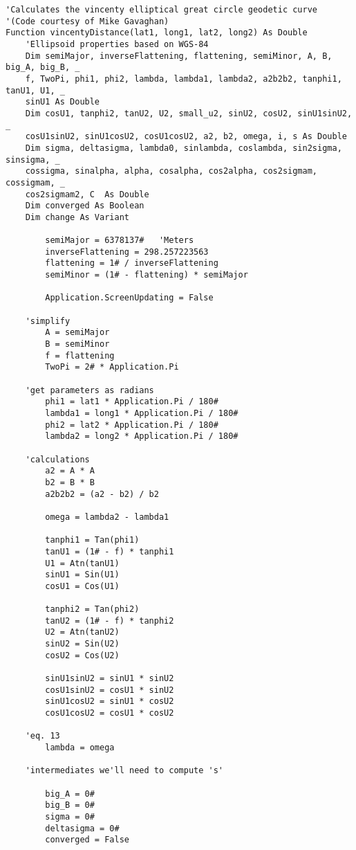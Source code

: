 \begin{lstlisting}
'Calculates the vincenty elliptical great circle geodetic curve 
'(Code courtesy of Mike Gavaghan)
Function vincentyDistance(lat1, long1, lat2, long2) As Double
    'Ellipsoid properties based on WGS-84
    Dim semiMajor, inverseFlattening, flattening, semiMinor, A, B, big_A, big_B, _
    f, TwoPi, phi1, phi2, lambda, lambda1, lambda2, a2b2b2, tanphi1, tanU1, U1, _
    sinU1 As Double
    Dim cosU1, tanphi2, tanU2, U2, small_u2, sinU2, cosU2, sinU1sinU2, _
    cosU1sinU2, sinU1cosU2, cosU1cosU2, a2, b2, omega, i, s As Double
    Dim sigma, deltasigma, lambda0, sinlambda, coslambda, sin2sigma, sinsigma, _
    cossigma, sinalpha, alpha, cosalpha, cos2alpha, cos2sigmam, cossigmam, _
    cos2sigmam2, C  As Double
    Dim converged As Boolean
    Dim change As Variant
        
        semiMajor = 6378137#   'Meters
        inverseFlattening = 298.257223563
        flattening = 1# / inverseFlattening
        semiMinor = (1# - flattening) * semiMajor
        
        Application.ScreenUpdating = False

    'simplify
        A = semiMajor
        B = semiMinor
        f = flattening
        TwoPi = 2# * Application.Pi

    'get parameters as radians
        phi1 = lat1 * Application.Pi / 180#
        lambda1 = long1 * Application.Pi / 180#
        phi2 = lat2 * Application.Pi / 180#
        lambda2 = long2 * Application.Pi / 180#

    'calculations
        a2 = A * A
        b2 = B * B
        a2b2b2 = (a2 - b2) / b2

        omega = lambda2 - lambda1

        tanphi1 = Tan(phi1)
        tanU1 = (1# - f) * tanphi1
        U1 = Atn(tanU1)
        sinU1 = Sin(U1)
        cosU1 = Cos(U1)
    
        tanphi2 = Tan(phi2)
        tanU2 = (1# - f) * tanphi2
        U2 = Atn(tanU2)
        sinU2 = Sin(U2)
        cosU2 = Cos(U2)
    
        sinU1sinU2 = sinU1 * sinU2
        cosU1sinU2 = cosU1 * sinU2
        sinU1cosU2 = sinU1 * cosU2
        cosU1cosU2 = cosU1 * cosU2

    'eq. 13
        lambda = omega

    'intermediates we'll need to compute 's'
    
        big_A = 0#
        big_B = 0#
        sigma = 0#
        deltasigma = 0#
        converged = False


\end{lstlisting}
